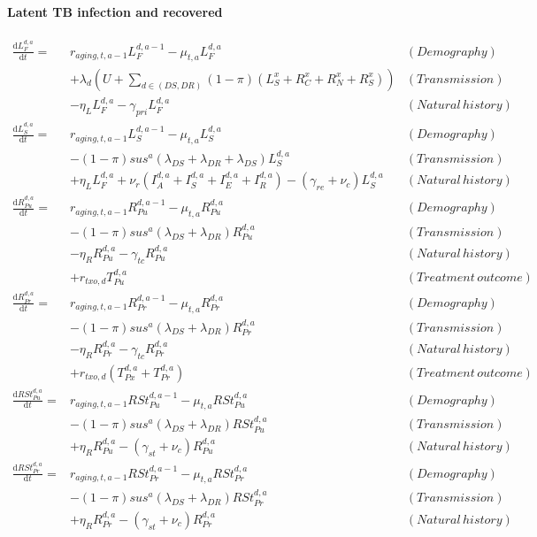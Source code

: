 \paragraph{Latent TB infection and recovered}
\begin{align*}
\frac{\mathrm{d}L_F^{d, a}}{\mathrm{d}t} =& r_{aging, t, a-1} L_F^{d, a - 1} - \mu_{t, a} L_F^{d, a} & (Demography)\\
  &+ \lambda_{d}(U + \sum_{d\in (DS, DR)}(1-\pi)(L_S^x + R_C^x + R_N^x +R_S^x)) & (Transmission) \\
  &- \eta_L L_F^{d, a} - \gamma_{pri} L_F^{d, a} & (Natural\,history)\\
\frac{\mathrm{d}L_S^{d, a}}{\mathrm{d}t} =& r_{aging, t, a-1} L_S^{d, a - 1} - \mu_{t, a} L_S^{d, a} & (Demography)\\
  &- (1 - \pi)sus^{a}(\lambda_{DS}+\lambda_{DR}+\lambda_{DS})L_S^{d, a} & (Transmission) \\
  &+ \eta_L L_F^{d, a} + \nu_{r} (I_A^{d, a} + I_S^{d, a} + I_E^{d, a} + I_R^{d, a}) - (\gamma_{re} + \nu_{c}) L_S^{d, a} & (Natural\,history)\\
\frac{\mathrm{d}R_{Pu}^{d, a}}{\mathrm{d}t} =& r_{aging, t, a-1} R_{Pu}^{d, a - 1} - \mu_{t, a} R_{Pu}^{d, a} & (Demography)\\
  &- (1-\pi)sus^{a}(\lambda_{DS}+\lambda_{DR})R_{Pu}^{d, a} & (Transmission) \\
  &- \eta_R R_{Pu}^{d, a} - \gamma_{tc} R_{Pu}^{d, a} & (Natural\,history)\\
  &+ r_{txo, d}T_{Pu}^{d, a} & (Treatment\,outcome)\\
\frac{\mathrm{d}R_{Pr}^{d, a}}{\mathrm{d}t} =& r_{aging, t, a-1} R_{Pr}^{d, a - 1} - \mu_{t, a} R_{Pr}^{d, a} & (Demography)\\
  &- (1-\pi)sus^{a}(\lambda_{DS} + \lambda_{DR})R_{Pr}^{d, a} & (Transmission) \\
  &- \eta_R R_{Pr}^{d, a} - \gamma_{tc} R_{Pr}^{d, a} & (Natural\,history)\\
  &+ r_{txo, d}(T_{Px}^{d, a} + T_{Pr}^{d, a}) & (Treatment\,outcome)\\
\frac{\mathrm{d}RSt_{Pu}^{d, a}}{\mathrm{d}t} =& r_{aging, t, a-1} RSt_{Pu}^{d, a - 1} - \mu_{t, a} RSt_{Pu}^{d, a} & (Demography)\\
  &- (1-\pi)sus^{a}(\lambda_{DS}+\lambda_{DR})RSt_{Pu}^{d, a} & (Transmission) \\
  &+ \eta_R R_{Pu}^{d, a} - (\gamma_{st} + \nu_{c}) R_{Pu}^{d, a} & (Natural\,history) \\
\frac{\mathrm{d}RSt_{Pr}^{d, a}}{\mathrm{d}t} =& r_{aging, t, a-1} RSt_{Pr}^{d, a - 1} - \mu_{t, a} RSt_{Pr}^{d, a} & (Demography)\\
  &- (1-\pi)sus^{a}(\lambda_{DS}+\lambda_{DR})RSt_{Pr}^{d, a} & (Transmission) \\
  &+ \eta_R R_{Pr}^{d, a} - (\gamma_{st} + \nu_{c}) R_{Pr}^{d, a} & (Natural\,history)
\end{align*}


